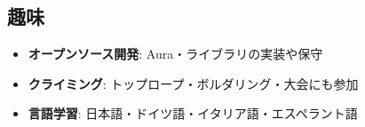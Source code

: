 \documentclass[letterpaper,11pt]{article}
\newcommand{\resumeItem}[2]{
  \item\small{
    \textbf{#1}{: #2 \vspace{-2pt}}
  }
}
\newcommand{\resumeSubItem}[2]{\resumeItem{#1}{#2}\vspace{-4pt}}
\newcommand{\resumeSubHeadingListStart}{\begin{itemize}[leftmargin=*]}
\newcommand{\resumeSubHeadingListEnd}{\end{itemize}}
\begin{document}
\begin{CJK}{UTF8}{ipxma}
\section{趣味}
\resumeSubHeadingListStart
\resumeSubItem{オープンソース開発}{Aura・ライブラリの実装や保守}
\resumeSubItem{クライミング}{トップロープ・ボルダリング・大会にも参加}
\resumeSubItem{言語学習}{日本語・ドイツ語・イタリア語・エスペラント語}
\resumeSubHeadingListEnd

%
\end{CJK}
\end{document}
